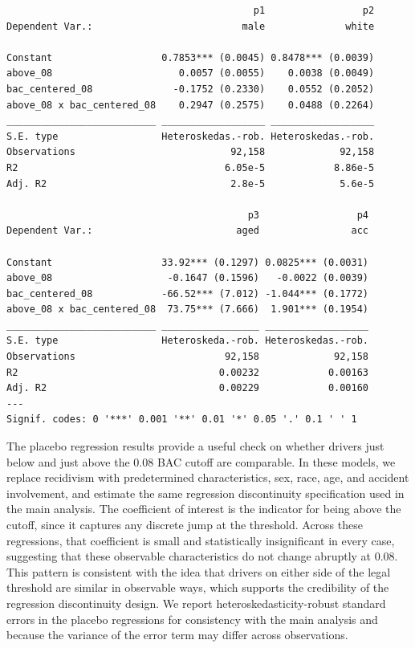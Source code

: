 \documentclass[
  letterpaper,
  DIV=11,
  numbers=noendperiod]{scrartcl}
\begin{document}
\begin{verbatim}
                                           p1                 p2
Dependent Var.:                          male              white
                                                                
Constant                   0.7853*** (0.0045) 0.8478*** (0.0039)
above_08                      0.0057 (0.0055)    0.0038 (0.0049)
bac_centered_08              -0.1752 (0.2330)    0.0552 (0.2052)
above_08 x bac_centered_08    0.2947 (0.2575)    0.0488 (0.2264)
__________________________ __________________ __________________
S.E. type                  Heteroskedas.-rob. Heteroskedas.-rob.
Observations                           92,158             92,158
R2                                    6.05e-5            8.86e-5
Adj. R2                                2.8e-5             5.6e-5

                                          p3                 p4
Dependent Var.:                         aged                acc
                                                               
Constant                   33.92*** (0.1297) 0.0825*** (0.0031)
above_08                    -0.1647 (0.1596)   -0.0022 (0.0039)
bac_centered_08            -66.52*** (7.012) -1.044*** (0.1772)
above_08 x bac_centered_08  73.75*** (7.666)  1.901*** (0.1954)
__________________________ _________________ __________________
S.E. type                  Heteroskeda.-rob. Heteroskedas.-rob.
Observations                          92,158             92,158
R2                                   0.00232            0.00163
Adj. R2                              0.00229            0.00160
---
Signif. codes: 0 '***' 0.001 '**' 0.01 '*' 0.05 '.' 0.1 ' ' 1
\end{verbatim}

The placebo regression results provide a useful check on whether drivers
just below and just above the 0.08 BAC cutoff are comparable. In these
models, we replace recidivism with predetermined characteristics, sex,
race, age, and accident involvement, and estimate the same regression
discontinuity specification used in the main analysis. The coefficient
of interest is the indicator for being above the cutoff, since it
captures any discrete jump at the threshold. Across these regressions,
that coefficient is small and statistically insignificant in every case,
suggesting that these observable characteristics do not change abruptly
at 0.08. This pattern is consistent with the idea that drivers on either
side of the legal threshold are similar in observable ways, which
supports the credibility of the regression discontinuity design. We
report heteroskedasticity-robust standard errors in the placebo
regressions for consistency with the main analysis and because the
variance of the error term may differ across observations.
\end{document}

